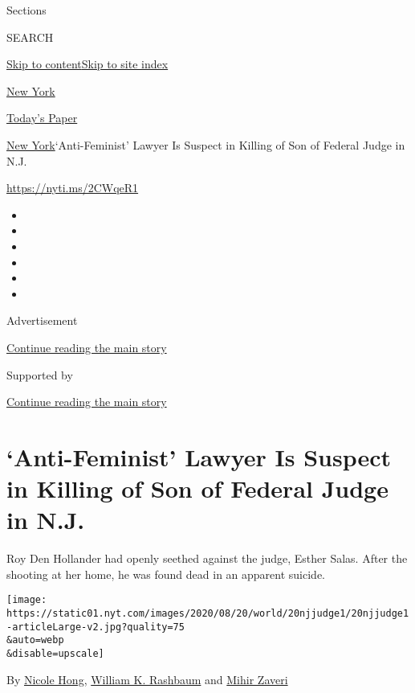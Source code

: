 Sections

SEARCH

\protect\hyperlink{site-content}{Skip to
content}\protect\hyperlink{site-index}{Skip to site index}

\href{https://www.nytimes.com/section/nyregion}{New York}

\href{https://myaccount.nytimes.com/auth/login?response_type=cookie\&client_id=vi}{}

\href{https://www.nytimes.com/section/todayspaper}{Today's Paper}

\href{/section/nyregion}{New York}\textbar{}`Anti-Feminist' Lawyer Is
Suspect in Killing of Son of Federal Judge in N.J.

\url{https://nyti.ms/2CWqeR1}

\begin{itemize}
\item
\item
\item
\item
\item
\item
\end{itemize}

Advertisement

\protect\hyperlink{after-top}{Continue reading the main story}

Supported by

\protect\hyperlink{after-sponsor}{Continue reading the main story}

\hypertarget{anti-feminist-lawyer-is-suspect-in-killing-of-son-of-federal-judge-in-nj}{%
\section{`Anti-Feminist' Lawyer Is Suspect in Killing of Son of Federal
Judge in
N.J.}\label{anti-feminist-lawyer-is-suspect-in-killing-of-son-of-federal-judge-in-nj}}

Roy Den Hollander had openly seethed against the judge, Esther Salas.
After the shooting at her home, he was found dead in an apparent
suicide.

\texttt{[image: https://static01.nyt.com/images/2020/08/20/world/20njjudge1/20njjudge1-articleLarge-v2.jpg?quality=75\\\&auto=webp\\\&disable=upscale]}

By \href{https://www.nytimes.com/by/nicole-hong}{Nicole Hong},
\href{https://www.nytimes.com/by/william-k-rashbaum}{William K.
Rashbaum} and \href{https://www.nytimes.com/by/mihir-zaveri}{Mihir
Zaveri}

